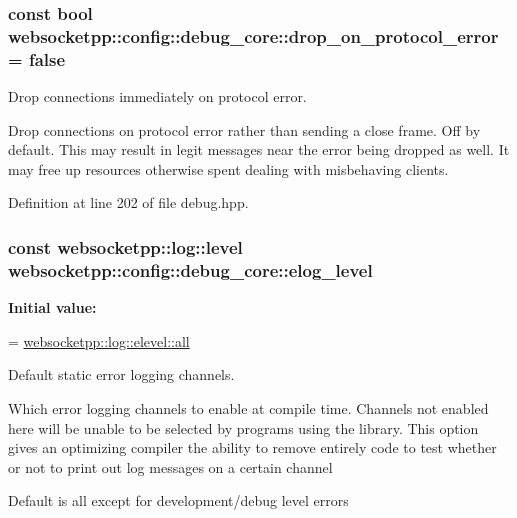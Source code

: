 \subsubsection[{drop\+\_\+on\+\_\+protocol\+\_\+error}]{\setlength{\rightskip}{0pt plus 5cm}const bool websocketpp\+::config\+::debug\+\_\+core\+::drop\+\_\+on\+\_\+protocol\+\_\+error = false\hspace{0.3cm}{\ttfamily [static]}}\label{structwebsocketpp_1_1config_1_1debug__core_a0f046a730b161555c644dc40df9ea870}


Drop connections immediately on protocol error. 

Drop connections on protocol error rather than sending a close frame. Off by default. This may result in legit messages near the error being dropped as well. It may free up resources otherwise spent dealing with misbehaving clients. 

Definition at line 202 of file debug.\+hpp.

\hypertarget{structwebsocketpp_1_1config_1_1debug__core_a0f2c26586b53faefef4386473092886e}{}
\subsubsection[{elog\+\_\+level}]{\setlength{\rightskip}{0pt plus 5cm}const {\bf websocketpp\+::log\+::level} websocketpp\+::config\+::debug\+\_\+core\+::elog\+\_\+level\hspace{0.3cm}{\ttfamily [static]}}\label{structwebsocketpp_1_1config_1_1debug__core_a0f2c26586b53faefef4386473092886e}
{\bfseries Initial value\+:}
\begin{DoxyCode}
=
        \hyperlink{structwebsocketpp_1_1log_1_1elevel_a9b31ff708c221d314f9f4eb3ff2b1ad7}{websocketpp::log::elevel::all}
\end{DoxyCode}


Default static error logging channels. 

Which error logging channels to enable at compile time. Channels not enabled here will be unable to be selected by programs using the library. This option gives an optimizing compiler the ability to remove entirely code to test whether or not to print out log messages on a certain channel

Default is all except for development/debug level errors 


